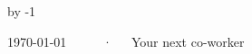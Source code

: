 \documentclass[11pt, a4paper]{awesome-cv}
\newcommand{\jobType}{product}
\begin{document}
\makecvheader[C]

\advance\day by -1

\makecvfooter
  {\today}
  {\profileName \ \profileLastName \ ~~~·~~~Your next co-worker}
  {\thepage}


%





\end{document}
